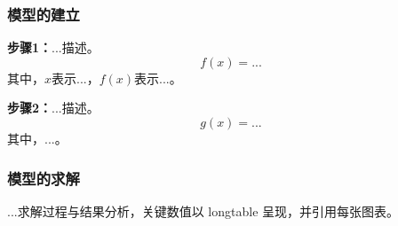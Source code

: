 
\subsubsection{模型的建立}

\textbf{步骤1：}...描述。
\begin{equation}
  f(x) = ...
\end{equation}
其中，$x$表示...，$f(x)$表示...。

\textbf{步骤2：}...描述。
\begin{equation}
  g(x) = ...
\end{equation}
其中，...。

\subsubsection{模型的求解}

...求解过程与结果分析，关键数值以 longtable 呈现，并引用每张图表。
